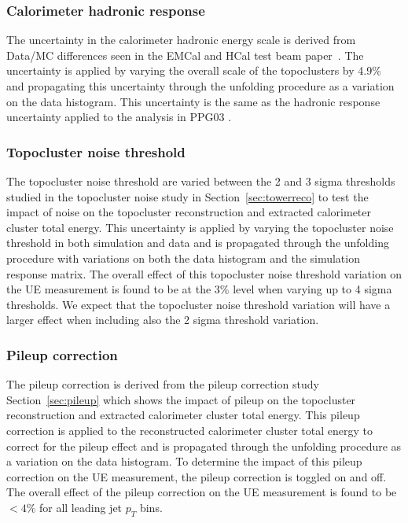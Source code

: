 \subsubsection{Calorimeter hadronic response}
The uncertainty in the calorimeter hadronic energy scale is derived from Data/MC differences seen in the EMCal and HCal test beam paper~\cite{emcal_beamtest,emcal_hcal_beamtest}.
The uncertainty is applied by varying the overall scale of the topoclusters by 4.9\% and propagating this uncertainty through the unfolding procedure as a variation on the data histogram.
This uncertainty is the same as the hadronic response uncertainty applied to the \detdeta analysis in PPG03 \cite{ppg03AN}.

\subsubsection{Topocluster noise threshold}
The topocluster noise threshold are varied between the 2 and 3 sigma thresholds studied in the topocluster noise study in Section~\ref{sec:towerreco} to test the impact of noise on the topocluster reconstruction and extracted calorimeter cluster total energy.
This uncertainty is applied by varying the topocluster noise threshold in both simulation and data and is propagated through the unfolding procedure with variations on both the data histogram and the simulation response matrix.
The overall effect of this topocluster noise threshold variation on the UE measurement is found to be at the 3\% level when varying up to 4 sigma thresholds.
We expect that the topocluster noise threshold variation will have a larger effect when including also the 2 sigma threshold variation.

\subsubsection{Pileup correction}
The pileup correction is derived from the pileup correction study Section~\ref{sec:pileup} which shows the impact of pileup on the topocluster reconstruction and extracted calorimeter cluster total energy.
This pileup correction is applied to the reconstructed calorimeter cluster total energy to correct for the pileup effect and is propagated through the unfolding procedure as a variation on the data histogram.
To determine the impact of this pileup correction on the UE measurement, the pileup correction is toggled on and off.
The overall effect of the pileup correction on the UE measurement is found to be $< 4\%$ for all leading jet $p_T$ bins.

